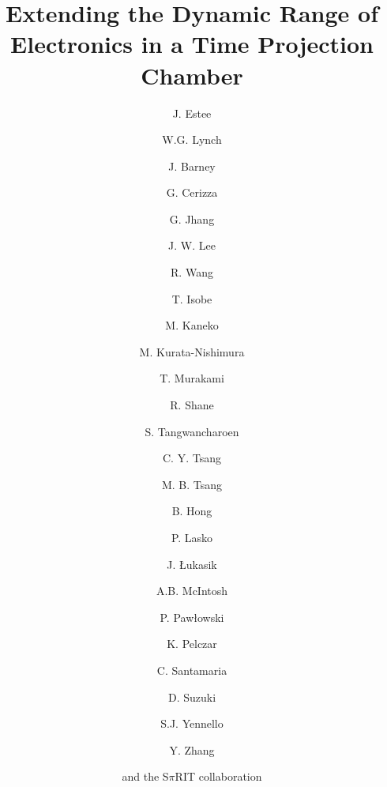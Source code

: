 \documentclass[review]{elsarticle}
\begin{document}
\begin{frontmatter}

\title{Extending the Dynamic Range of Electronics in a Time Projection Chamber}


\author[nscl,msu]{J. Estee}
\author[nscl,msu]{W.G. Lynch}
\author[nscl,msu]{J. Barney}
\author[nscl,msu]{G. Cerizza}
\author[nscl]{G. Jhang}
\author[kor]{J. W. Lee}
\author[nscl]{R. Wang}
\author[riken]{T. Isobe}
\author[kyoto]{M. Kaneko}
\author[riken]{M. Kurata-Nishimura}
\author[kyoto]{T. Murakami}
\author[nscl]{R. Shane}
\author[nscl]{S. Tangwancharoen}
\author[nscl]{C. Y. Tsang}
\author[nscl]{M. B. Tsang}
\author[kor]{B. Hong}
\author[krakow]{P. Lasko}
\author[krakow]{J. \L ukasik}
\author[a&m]{A.B. McIntosh}
\author[krakow]{P. Paw\l owski}
\author[poland]{K. Pelczar}
\author[nscl]{C. Santamaria}
\author[riken]{D. Suzuki}
\author[a&m]{S.J. Yennello}
\author[tsing]{Y. Zhang}
\author[]{and the S$\pi$RIT collaboration}

\address[nscl]{National Superconducting Cyclotron Laboratory, East Lansing, Michigan, 48824, USA}
\address[msu]{Department of Physics and Astronomy, Michigan State University, East Lansing, Michigan, 48824, USA }
\address[kor]{Department of Physics, Korea University, Seoul 136-703, Republic of Korea }
\address[riken]{RIKEN Nishina Center, Hirosawa 2-1, Wako, Saitama 351‐0198, Japan }
\address[kyoto]{Department of Physics, Kyoto University, Kita-shirakawa, Kyoto 606-8502, Japan }
\address[krakow]{Institute of Nuclear Physics PAN, ul. Radzikowskiego 15231-342 Krak\'{o}w, Poland}
\address[a&m]{Cyclotron Institute, Texas A$\&$M University, College Station, TX 77843, USA }
\address[tsing]{Department of Physics, Tsinghua University, Beijing 100084, P. R. China}
\address[poland]{Faculty of Physics, Astronomy and Applied Computer Science, Jagiellonian University, ul. Go\l \k{e}bia 24, 31-007 Krak\'{o}w}



\begin{abstract}


\end{abstract}
\end{frontmatter}
\end{document}
